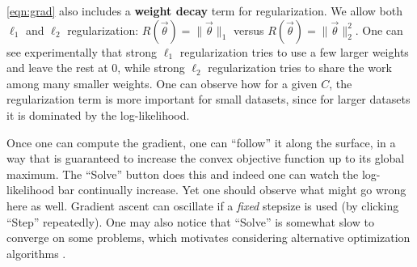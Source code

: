 \documentclass[11pt,letterpaper]{article}
\begin{document}

\eqref{eqn:grad} also includes a \textbf{weight decay} term for
regularization.  We allow both $\ell_1$ and $\ell_2$ regularization:
$R(\vec{\theta}) = \|\vec\theta\|_1$ versus $R(\vec{\theta}) =
\|\vec{\theta}\|_2^2$.  One can see experimentally that strong $\ell_1$
regularization tries to use a few larger weights and leave the rest at
0, while strong $\ell_2$ regularization tries to share the work among
many smaller weights.  One can observe how for a given $C$, the
regularization term is more important for small datasets, since for larger
datasets it is dominated by the log-likelihood.

%

Once one can compute the gradient, one can ``follow'' it along the
surface, in a way that is guaranteed to increase the convex objective
function up to its global maximum.  The ``Solve'' button does this and
indeed one can watch the log-likelihood bar continually increase.  Yet
one should observe what might go wrong here as well.  Gradient
ascent can oscillate if a {\em fixed} stepsize is used (by clicking
``Step'' repeatedly).  One may also notice that ``Solve'' is somewhat
slow to converge on some problems, which motivates considering
alternative optimization algorithms \cite{malouf2002comparison}.


%
\end{document}
